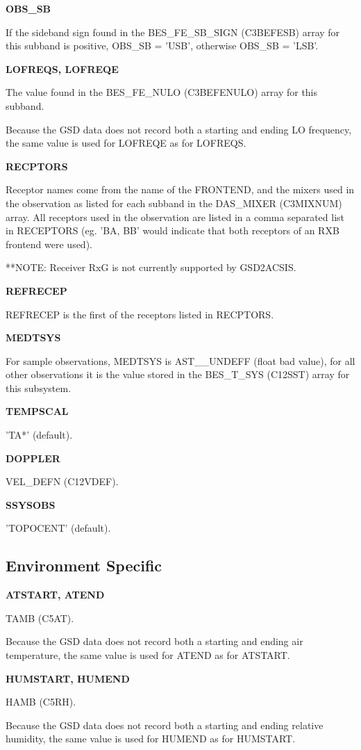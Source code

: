 \documentclass[twoside,11pt,nolof]{starlink}
\providecommand{\tamb}{TAMB (C5AT)}
\providecommand{\hamb}{HAMB (C5RH)}
\providecommand{\velDefn}{VEL\_DEFN (C12VDEF)}
\providecommand{\mixNums}{DAS\_MIXER (C3MIXNUM)}
\providecommand{\LOFreqs}{BES\_FE\_NULO (C3BEFENULO)}
\providecommand{\sbSigns}{BES\_FE\_SB\_SIGN (C3BEFESB)}
\providecommand{\sourceSysTemps}{BES\_T\_SYS (C12SST)}
\begin{document}
\textbf{OBS\_SB}

If the sideband sign found in the \sbSigns{} array for this subband is positive, OBS\_SB = 'USB', otherwise OBS\_SB = 'LSB'.

\textbf{LOFREQS, LOFREQE}

The value found in the \LOFreqs{} array for this subband.

Because the GSD data does not record both a starting and ending LO frequency, the same value is used for LOFREQE as for LOFREQS.

\textbf{RECPTORS}

Receptor names come from the name of the FRONTEND, and the mixers used in the observation as listed for each subband in the \mixNums{} array.  All receptors used in the observation are listed in a comma separated list in RECEPTORS (eg. 'BA, BB' would indicate that both receptors of an RXB frontend were used).

**NOTE: Receiver RxG is not currently supported by GSD2ACSIS.

\textbf{REFRECEP}

REFRECEP is the first of the receptors listed in RECPTORS.

\textbf{MEDTSYS}

For sample observations, MEDTSYS is AST\_\_UNDEFF (float bad value), for all other observations it is the value stored in the \sourceSysTemps{} array for this subsystem.

\textbf{TEMPSCAL}

'TA*' (default).

\textbf{DOPPLER}

\velDefn.

\textbf{SSYSOBS}

'TOPOCENT' (default).

\subsection{Environment Specific}

\textbf{ATSTART, ATEND}

\tamb.

Because the GSD data does not record both a starting and ending air temperature, the same value is used for ATEND as for ATSTART.

\textbf{HUMSTART, HUMEND}

\hamb.

Because the GSD data does not record both a starting and ending relative humidity, the same value is used for HUMEND as for HUMSTART.
\end{document}

